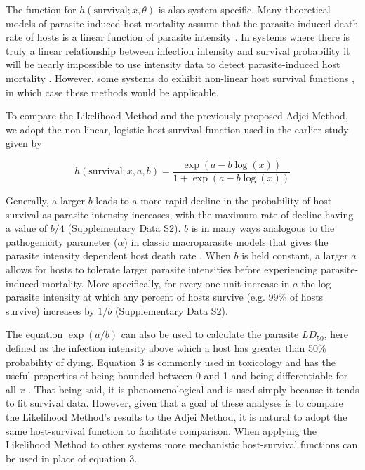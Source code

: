 \documentclass[12pt, a4paper]{article}
\begin{document}
The function for $h(\text{survival}; x,
\theta)$ is also system specific.  Many
theoretical models of parasite-induced host mortality assume that the parasite-induced death rate of hosts is a linear function of parasite intensity
\citep{AndersonandMay1978,Dobson1992,Barbour2000}. In systems where there is truly a linear relationship between infection intensity and survival probability it will be nearly impossible to use intensity data to detect parasite-induced host mortality \citep{Lanciani1989}.  However, some systems do exhibit non-linear host survival functions \citep{Benesh2011}, in which case these methods would be applicable.

To compare the Likelihood Method and the previously proposed Adjei Method, we adopt the non-linear, logistic host-survival function used in the earlier study given by

\begin{equation}
    h(\text{survival}; x, a, b) = \dfrac{\exp{(a - b \log(x))}}{1 + \exp{(a - b \log(x))}}
    \label{eq:logistic}
\end{equation}

Generally, a larger $b$ leads to a more rapid decline in the probability of host survival as parasite intensity increases, with the maximum rate of decline having a value of $b / 4$ (Supplementary Data S2). $b$ is in many ways analogous to the pathogenicity parameter ($\alpha$) in classic macroparasite models that gives the parasite intensity dependent host death rate \citep{AndersonandMay1978,Isham1995}. When $b$ is held constant, a larger $a$ allows for hosts to tolerate larger parasite intensities before experiencing parasite-induced mortality. More specifically, for every one unit increase in $a$ the log parasite intensity at which any percent of hosts survive (e.g. 99\% of hosts survive) increases by $1 / b$ (Supplementary Data S2).

The equation $\exp(a
/ b)$ can also be used to calculate the parasite $LD_{50}$, here defined as the
infection intensity above which a host has greater than 50\% probability of dying.  Equation 3 is commonly used in toxicology and has the useful properties of being bounded between 0 and 1 and being differentiable for all $x$ \citep{Collet2002}.  That being said, it is phenomenological and is used simply because it tends to fit survival data. However, given that a goal of these analyses is to
compare the Likelihood Method's results to the Adjei Method, it is natural
to adopt the same host-survival function to facilitate comparison.  When
applying the Likelihood Method to other systems more mechanistic host-survival functions can be used in place of equation 3.
\end{document}
